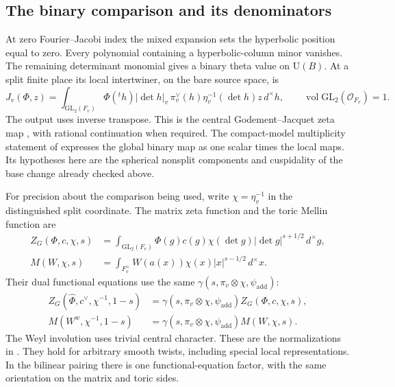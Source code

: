 \subsection{The binary comparison and its denominators}

At zero Fourier--Jacobi index the mixed expansion sets the
hyperbolic position equal to zero.  Every polynomial containing a
hyperbolic-column minor vanishes.  The remaining determinant
monomial gives a binary theta value on $\mathrm U(B)$.
At a split finite place its local intertwiner, on the bare source
space, is
\begin{equation}\label{theta:binary-map}
 J_v(\Phi,z)=\int_{\mathrm{GL}_2(F_v)}
  \Phi({}^th)|\det h|_v\,
  \pi_v^\vee(h)\eta_v^{-1}(\det h)z\,d^\times h,
 \qquad \operatorname{vol}\mathrm{GL}_2(\mathcal O_{F_v})=1.
\end{equation}
The output uses inverse transpose.  This is the central
Godement--Jacquet zeta map \cite{GodementJacquet}, with rational
continuation when required.
The compact-model multiplicity statement of
\cite[Section 5, ``The binary scalar and its multiplicity'']{C} expresses the global
binary map as one scalar times the local maps.  Its hypotheses here
are the spherical nonsplit components and cuspidality of the base
change already checked above.

For precision about the comparison being used, write
$\chi=\eta_v^{-1}$ in the distinguished split coordinate.  The
matrix zeta function and the toric Mellin function are
\[
 \begin{split}
 Z_G(\Phi,c,\chi,s)
   &=\int_{\mathrm{GL}_2(F_v)}
       \Phi(g)c(g)\chi(\det g)|\det g|^{s+1/2}\,d^\times g,\\
 M(W,\chi,s)
   &=\int_{F_v^\times}W(a(x))\chi(x)|x|^{s-1/2}\,d^\times x.
 \end{split}
\]
Their dual functional equations use the same
$\gamma(s,\pi_v\otimes\chi,\psi_{\mathrm{add}})$:
\[
 \begin{split}
 Z_G(\widehat\Phi,c^\vee,\chi^{-1},1-s)
     &=\gamma(s,\pi_v\otimes\chi,\psi_{\mathrm{add}})
                        Z_G(\Phi,c,\chi,s),\\
 M(W^w,\chi^{-1},1-s)
     &=\gamma(s,\pi_v\otimes\chi,\psi_{\mathrm{add}})
                        M(W,\chi,s).
 \end{split}
\]
The Weyl involution uses trivial central character.  These are the
normalizations in \cite[Equations (5.8) and (5.10)]{C}.  They hold for arbitrary
smooth twists, including special local representations.  In the
bilinear pairing there is one functional-equation factor, with the
same orientation on the matrix and toric sides.

